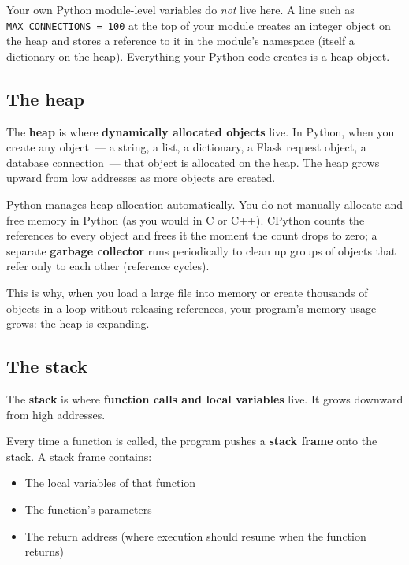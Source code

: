 \noindent{}Your own Python module-level variables do \emph{not} live here. A line such as \texttt{MAX\_CONNECTIONS\ =}\allowbreak{}\texttt{\ 100} at the top of your module creates an integer object on the heap and stores a reference to it in the module's namespace (itself a dictionary on the heap). Everything your Python code creates is a heap object.

\subsection*{The heap}\label{01-command-to-process:the-heap}

The \textbf{heap} is where \textbf{dynamically allocated objects} live. In Python, when you create any object~--- a string, a list, a dictionary, a Flask request object, a database connection~--- that object is allocated on the heap. The heap grows upward from low addresses as more objects are created.

Python manages heap allocation automatically. You do not manually allocate and free memory in Python (as you would in C or C++). CPython counts the references to every object and frees it the moment the count drops to zero; a separate \textbf{garbage collector} runs periodically to clean up groups of objects that refer only to each other (reference cycles).

This is why, when you load a large file into memory or create thousands of objects in a loop without releasing references, your program's memory usage grows: the heap is expanding.

\subsection*{The stack}\label{01-command-to-process:the-stack}

The \textbf{stack} is where \textbf{function calls and local variables} live. It grows downward from high addresses.

Every time a function is called, the program pushes a \textbf{stack frame} onto the stack. A stack frame contains:

\begin{itemize}
\tightlist
\item
  The local variables of that function
\item
  The function's parameters
\item
  The return address (where execution should resume when the function returns)
\end{itemize}

